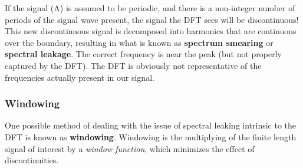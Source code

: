 \documentclass[a4paper]{article}
\numberwithin{equation}{section}
\begin{document}
If the signal (A) is assumed to be periodic, and there is a non-integer number of periods of the signal wave present, the signal the DFT sees will be discontinuous! This new discontinuous signal is decomposed into harmonics that are continuous over the boundary, resulting in what is known as \textbf{spectrum smearing} or \textbf{spectral leakage}. The correct frequency is near the peak (but not properly captured by the DFT). The DFT is obviously not representative of the frequencies actually present in our signal.\\

\subsubsection{Windowing}
One possible method of dealing with the issue of spectral leaking intrinsic to the DFT is known as \textbf{windowing}. Windowing is the multiplying of the finite length signal of interest by a \textit{window function}, which minimizes the effect of discontinuities.\\
\end{document}
